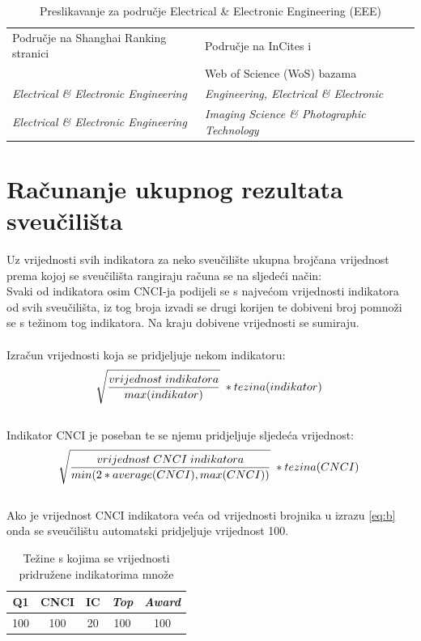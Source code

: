 \documentclass[times, utf8, zavrsni]{fer}
\begin{document}
\begin{table}[htb]
    \caption{Preslikavanje za područje Electrical \& Electronic Engineering (EEE)}
        \label{tbl:konstante1}
        \centering
        \begin{tabular}{ll} \hline
        Područje na Shanghai Ranking stranici & Područje na InCites i \\ & Web of Science (WoS) bazama\\ \hline
        \emph{Electrical \& Electronic Engineering} &  \emph{Engineering, Electrical \& Electronic}\\
        \emph{Electrical \& Electronic Engineering} &  \emph{Imaging Science \& Photographic Technology}\\
        \end{tabular}
        \end{table}    
        \FloatBarrier
\newpage
\section{Računanje ukupnog rezultata sveučilišta}
Uz vrijednosti svih indikatora za neko sveučilište ukupna brojčana vrijednost prema kojoj se sveučilišta rangiraju računa 
se na sljedeći način:
\\Svaki od indikatora osim CNCI-ja podijeli se s najvećom vrijednosti indikatora od svih sveučilišta, iz tog broja izvadi se
drugi korijen te dobiveni broj pomnoži se s težinom tog indikatora.
Na kraju dobivene vrijednosti se sumiraju.
\\
\\ Izračun vrijednosti koja se pridjeljuje nekom indikatoru: 
\begin{align}
    \sqrt[\leftroot{-2}]{\frac{vrijednost \; indikatora}{max(indikator)}} \; * tezina(indikator) \label{eq:a}
\end{align}
\\ Indikator CNCI je poseban te se njemu pridjeljuje sljedeća vrijednost: \\ 
\begin{align}
    \sqrt[\leftroot{-2}]{\frac{vrijednost \; CNCI \; indikatora}{min(2*average(CNCI), max(CNCI))}} \; * tezina(CNCI) \label{eq:b}
    \end{align}
\\ Ako je vrijednost CNCI indikatora veća od vrijednosti brojnika u izrazu \ref{eq:b} onda se sveučilištu automatski pridjeljuje vrijednost 100.

\begin{table}[htb]
    \caption{Težine s kojima se vrijednosti pridružene indikatorima množe}
        \label{tbl:konstante3}
        \centering
        \begin{tabular}{ccccc} \hline
        Q1 & CNCI & IC & \emph{Top} & \emph{Award} \\ \hline
        100&100&20&100&100\\
        \end{tabular}
        \end{table}    
        \FloatBarrier
\end{document}
